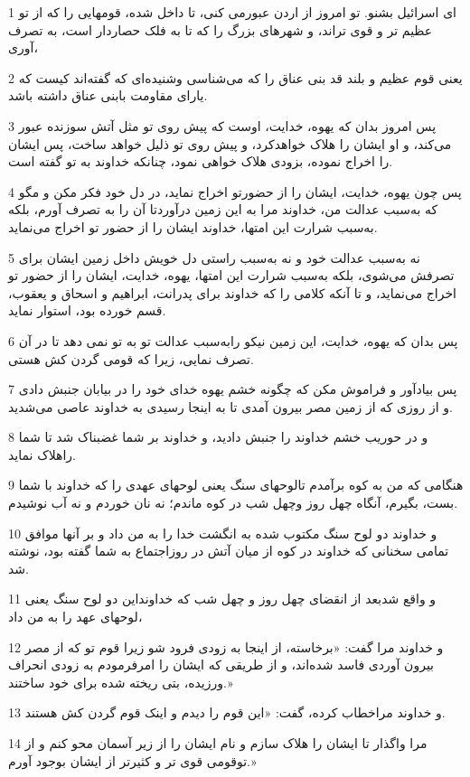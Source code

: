 \par 1 ای اسرائیل بشنو. تو امروز از اردن عبورمی کنی، تا داخل شده، قومهایی را که از تو عظیم تر و قوی تراند، و شهرهای بزرگ را که تا به فلک حصاردار است، به تصرف آوری،
\par 2 یعنی قوم عظیم و بلند قد بنی عناق را که می‌شناسی وشنیده‌ای که گفته‌اند کیست که یارای مقاومت بابنی عناق داشته باشد.
\par 3 پس امروز بدان که یهوه، خدایت، اوست که پیش روی تو مثل آتش سوزنده عبور می‌کند، و او ایشان را هلاک خواهدکرد، و پیش روی تو ذلیل خواهد ساخت، پس ایشان را اخراج نموده، بزودی هلاک خواهی نمود، چنانکه خداوند به تو گفته است.
\par 4 پس چون یهوه، خدایت، ایشان را از حضورتو اخراج نماید، در دل خود فکر مکن و مگو که به‌سبب عدالت من، خداوند مرا به این زمین درآوردتا آن را به تصرف آورم، بلکه به‌سبب شرارت این امتها، خداوند ایشان را از حضور تو اخراج می‌نماید.
\par 5 نه به‌سبب عدالت خود و نه به‌سبب راستی دل خویش داخل زمین ایشان برای تصرفش می‌شوی، بلکه به‌سبب شرارت این امتها، یهوه، خدایت، ایشان را از حضور تو اخراج می‌نماید، و تا آنکه کلامی را که خداوند برای پدرانت، ابراهیم و اسحاق و یعقوب، قسم خورده بود، استوار نماید.
\par 6 پس بدان که یهوه، خدایت، این زمین نیکو رابه‌سبب عدالت تو به تو نمی دهد تا در آن تصرف نمایی، زیرا که قومی گردن کش هستی.
\par 7 پس بیادآور و فراموش مکن که چگونه خشم یهوه خدای خود را در بیابان جنبش دادی و از روزی که از زمین مصر بیرون آمدی تا به اینجا رسیدی به خداوند عاصی می‌شدید.
\par 8 و در حوریب خشم خداوند را جنبش دادید، و خداوند بر شما غضبناک شد تا شما راهلاک نماید.
\par 9 هنگامی که من به کوه برآمدم تالوحهای سنگ یعنی لوحهای عهدی را که خداوند با شما بست، بگیرم، آنگاه چهل روز وچهل شب در کوه ماندم؛ نه نان خوردم و نه آب نوشیدم.
\par 10 و خداوند دو لوح سنگ مکتوب شده به انگشت خدا را به من داد و بر آنها موافق تمامی سخنانی که خداوند در کوه از میان آتش در روزاجتماع به شما گفته بود، نوشته شد.
\par 11 و واقع شدبعد از انقضای چهل روز و چهل شب که خداونداین دو لوح سنگ یعنی لوحهای عهد را به من داد،
\par 12 و خداوند مرا گفت: «برخاسته، از اینجا به زودی فرود شو زیرا قوم تو که از مصر بیرون آوردی فاسد شده‌اند، و از طریقی که ایشان را امرفرمودم به زودی انحراف ورزیده، بتی ریخته شده برای خود ساختند.»
\par 13 و خداوند مراخطاب کرده، گفت: «این قوم را دیدم و اینک قوم گردن کش هستند.
\par 14 مرا واگذار تا ایشان را هلاک سازم و نام ایشان را از زیر آسمان محو کنم و از توقومی قوی تر و کثیرتر از ایشان بوجود آورم.»
